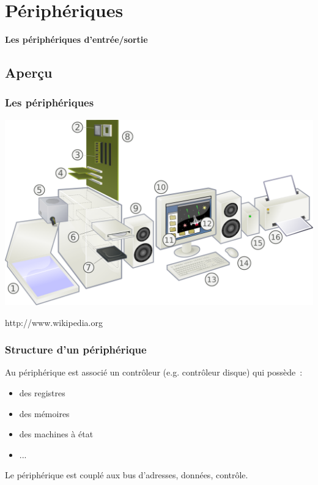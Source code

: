 \documentclass{beamer}
\begin{document}
\section{Périphériques}

\begin{frame}
\begin{center}
\textbf{Les périphériques d'entrée/sortie}
\end{center}
\end{frame}

\subsection{Aperçu}

\begin{frame}
\frametitle{Les périphériques}

\includegraphics[width=\linewidth]{Figs/peripherique.pdf}


\begin{tiny}
http://www.wikipedia.org
\end{tiny}

\end{frame}


\begin{frame}
\frametitle{Structure d'un périphérique}

Au périphérique est associé un contrôleur (e.g. contrôleur disque) qui possède~:
\begin{itemize}
\item des registres 
\item des mémoires 
\item des machines à état 
\item ...
\end{itemize} 
Le périphérique est couplé aux bus d'adresses, données, contrôle.

\end{frame}
\end{document}
